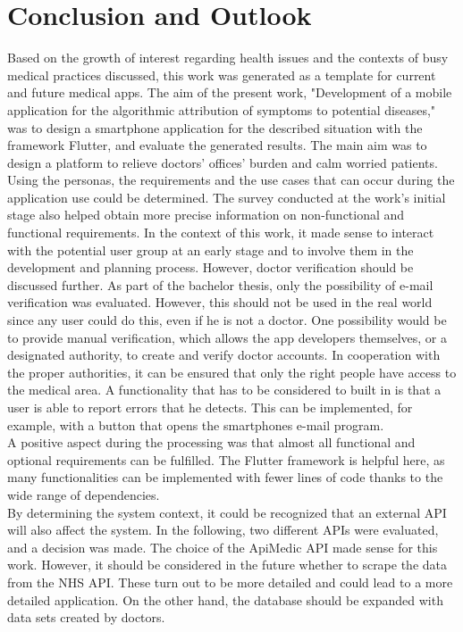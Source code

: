 \chapter{Conclusion and Outlook}
Based on the growth of interest regarding health issues and the contexts of busy medical practices discussed, this work was generated as a template for current and future medical apps.
The aim of the present work, "Development of a mobile application for the algorithmic attribution of symptoms to potential diseases," was to design a smartphone application for the described situation with the framework Flutter, and evaluate the generated results. The main aim was to design a platform to relieve doctors' offices' burden and calm worried patients. 
\newline \\
Using the personas, the requirements and the use cases that can occur during the application use could be determined. The survey conducted at the work's initial stage also helped obtain more precise information on non-functional and functional requirements. In the context of this work, it made sense to interact with the potential user group at an early stage and to involve them in the development and planning process. However, doctor verification should be discussed further. As part of the bachelor thesis, only the possibility of e-mail verification was evaluated. However, this should not be used in the real world since any user could do this, even if he is not a doctor. One possibility would be to provide manual verification, which allows the app developers themselves, or a designated authority, to create and verify doctor accounts. In cooperation with the proper authorities, it can be ensured that only the right people have access to the medical area. A functionality that has to be considered to built in is that a user is able to report errors that he detects. This can be implemented, for example, with a button that opens the smartphones e-mail program.
\newline \\
A positive aspect during the processing was that almost all functional and optional requirements can be fulfilled. The Flutter framework is helpful here, as many functionalities can be implemented with fewer lines of code thanks to the wide range of dependencies.
\newline \\
By determining the system context, it could be recognized that an external API will also affect the system. In the following, two different APIs were evaluated, and a decision was made. The choice of the ApiMedic API made sense for this work. However, it should be considered in the future whether to scrape the data from the NHS API. These turn out to be more detailed and could lead to a more detailed application. On the other hand, the database should be expanded with data sets created by doctors. 
